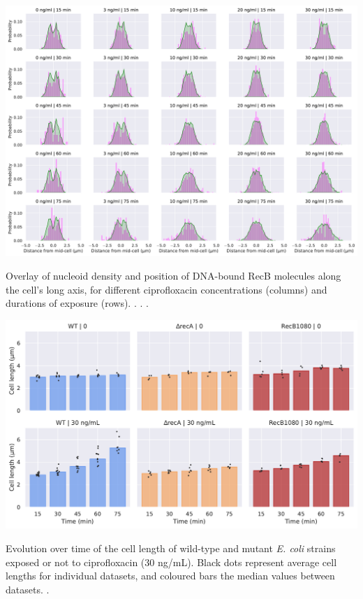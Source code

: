 \begin{suppfigure*}[htbp]
    \begin{center}
    \includegraphics[width=\textwidth]{SI_Figures/RecB_Nucleoid_position_timepoints.pdf}
    \end{center}
    \caption{Overlay of nucleoid density and position of DNA-bound RecB molecules along the cell's long axis, for different ciprofloxacin concentrations (columns) and durations of exposure (rows). . . .}
    \label{SIFig:recb_nucleoid_timepoints}
\end{suppfigure*}

\begin{suppfigure*}[htbp]
    \begin{center}
    \includegraphics[width=.8\textwidth]{SI_Figures/Mutants_cell_lengths.pdf}
    \end{center}
    \caption{Evolution over time of the cell length of wild-type and mutant \emph{E. coli} strains exposed or not to ciprofloxacin (30 ng/mL). Black dots represent average cell lengths for individual datasets, and coloured bars the median values between datasets. .}
    \label{SIFig:mutants_cell_lengths}
\end{suppfigure*}

